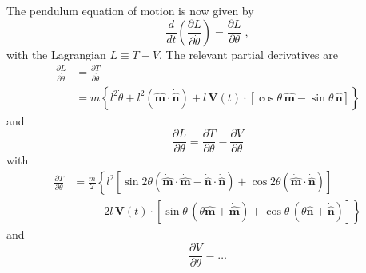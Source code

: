 \documentclass[12pt]{article}
\providecommand{\vecsymbol}[1]{\ensuremath{\boldsymbol{#1}}}
\providecommand{\Vv}{\vecsymbol{V}}
\providecommand{\mv}{\hat{\vecsymbol{m}}}
\providecommand{\nv}{\hat{\vecsymbol{n}}}
\providecommand{\thdot}{\dot{\theta}}
\begin{document}
The pendulum equation of motion is now given by
\begin{equation}
\frac{d}{dt} \left( \frac{\partial L}{\partial \thdot} \right) =
\frac{\partial L}{\partial \theta} \; ,
\end{equation}
with the Lagrangian $L \equiv T - V$. The relevant partial derivatives are
\begin{equation}
\begin{split}
\frac{\partial L}{\partial \thdot}
&= \frac{\partial T}{\partial \thdot} \\
&= m \left\{ l^2\thdot  + l^2 (\mv\cdot\dot{\nv})
+ l\,\Vv(t)\cdot\left[ \cos\theta\,\mv - \sin\theta\,\nv\right] \right\}
\end{split}
\end{equation}
and
\begin{equation}
\frac{\partial L}{\partial \theta} = \frac{\partial T}{\partial \theta} - \frac{\partial V}{\partial \theta}
\end{equation}
with
\begin{equation}
\begin{split}
\frac{\partial T}{\partial \theta} &= \frac{m}{2} \left\{
l^2 \left[ \sin 2\theta \left( \dot{\mv}\cdot\dot{\mv} - \dot{\nv}\cdot\dot{\nv}\right) +
\cos 2\theta \left(\dot{\mv}\cdot\dot{\nv}\right) \right] \right. \\
&\qquad \left. -2 l\,\Vv(t)\cdot\left[ \sin\theta\,(\thdot \mv+\dot{\mv}) +
\cos\theta\,(\thdot \nv+\dot{\nv})\right]
\right\}
\end{split}
\end{equation}
and
\begin{equation}
\frac{\partial V}{\partial \theta} = \ldots
\end{equation}
\end{document}
